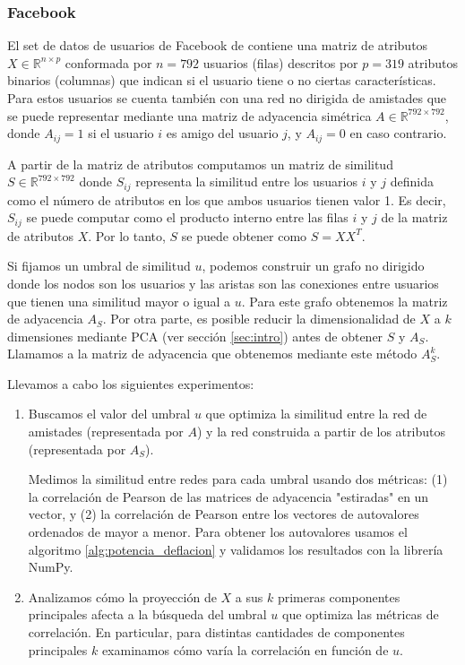 \documentclass{article}
\begin{document}
\subsubsection{Facebook} \label{sec:facebook}

El set de datos de usuarios de Facebook de \citet{leskovec2012learning} contiene una matriz de atributos $X \in \mathbb{R}^{n \times p}$ conformada por $n=792$ usuarios (filas) descritos por $p=319$ atributos binarios (columnas) que indican si el usuario tiene o no ciertas características. Para estos usuarios se cuenta también con una red no dirigida de amistades que se puede representar mediante una matriz de adyacencia simétrica $A \in \mathbb{R}^{792 \times 792}$, donde $A_{ij} = 1$ si el usuario $i$ es amigo del usuario $j$, y $A_{ij} = 0$ en caso contrario. 

A partir de la matriz de atributos computamos un matriz de similitud $S \in \mathbb{R}^{792 \times 792}$ donde $S_{ij}$ representa la similitud entre los usuarios $i$ y $j$ definida como el número de atributos en los que ambos usuarios tienen valor 1. Es decir, $S_{ij}$ se puede computar como el producto interno entre las filas $i$ y $j$ de la matriz de atributos $X$. Por lo tanto, $S$ se puede obtener como $S = XX^T$. 

Si fijamos un umbral de similitud $u$, podemos construir un grafo no dirigido donde los nodos son los usuarios y las aristas son las conexiones entre usuarios que tienen una similitud mayor o igual a $u$. Para este grafo obtenemos la matriz de adyacencia $A_S$. Por otra parte, es posible reducir la dimensionalidad de $X$ a $k$ dimensiones mediante PCA (ver sección \ref{sec:intro}) antes de obtener $S$ y $A_S$. Llamamos a la matriz de adyacencia que obtenemos mediante este método $A_S^k$.  


Llevamos a cabo los siguientes experimentos:

\begin{enumerate}[leftmargin=.5cm]

    \item Buscamos el valor del umbral $u$ que optimiza la similitud entre la red de amistades (representada por $A$) y la red construida a partir de los atributos (representada por $A_S$). 

    Medimos la similitud entre redes para cada umbral usando dos métricas: (1) la correlación de Pearson de las matrices de adyacencia "estiradas" en un vector, y (2) la correlación de Pearson entre los vectores de autovalores ordenados de mayor a menor. Para obtener los autovalores usamos el algoritmo \ref{alg:potencia_deflacion} y validamos los resultados con la librería NumPy. 
    
    \item Analizamos cómo la proyección de $X$ a sus $k$ primeras componentes principales afecta a la búsqueda del umbral $u$ que optimiza las métricas de correlación. En particular, para distintas cantidades de componentes principales $k$ examinamos cómo varía la correlación en función de $u$.   

\end{enumerate}
\end{document}
